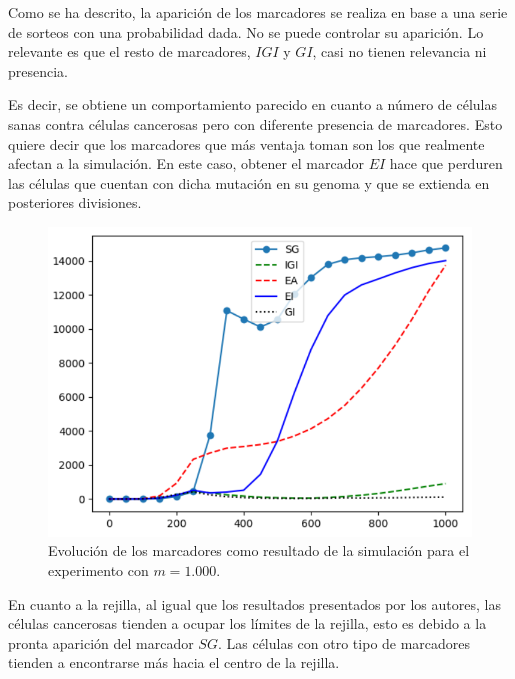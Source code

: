 Como se ha descrito, la aparición de los marcadores se realiza en base a una serie de sorteos con una probabilidad dada.
No se puede controlar su aparición. Lo relevante es que el resto de marcadores, $IGI$ y $GI$, casi no tienen relevancia
ni presencia.

Es decir, se obtiene un comportamiento parecido en cuanto a número de células sanas contra células cancerosas pero
con diferente presencia de marcadores. Esto quiere decir que los marcadores que más ventaja toman son los que realmente
afectan a la simulación. En este caso, obtener el marcador $EI$ hace que perduren las células que cuentan con dicha
mutación en su genoma y que se extienda en posteriores divisiones.

\begin{figure}[h]
\centering
\includegraphics[scale=0.8]{figures/experiments/exp2/mutations}
\caption{Evolución de los marcadores como resultado de la simulación para el experimento con $m = 1.000$.}
\end{figure}

En cuanto a la rejilla, al igual que los resultados presentados por los autores, las células cancerosas
tienden a ocupar los límites de la rejilla, esto es debido a la pronta aparición del marcador $SG$. Las células con
otro tipo de marcadores tienden a encontrarse más hacia el centro de la rejilla.

